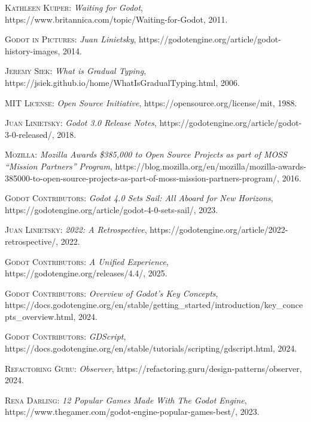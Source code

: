 \documentclass[
]{thesis-ekf}
\theoremstyle{definition}
\theoremstyle{remark}
\begin{document}
	\begin{thebibliography}{2}
		
		\textsc{Kathleen Kuiper}: \emph{Waiting for Godot}, https://www.britannica.com/topic/Waiting-for-Godot, 2011.
		
		\textsc{Godot in Pictures}: \emph{Juan Linietsky}, https://godotengine.org/article/godot-history-images, 2014.
		
		\textsc{Jeremy Siek}: \emph{What is Gradual Typing}, https://jsiek.github.io/home/WhatIsGradualTyping.html, 2006.
		
		\textsc{MIT License}: \emph{Open Source Initiative}, https://opensource.org/license/mit, 1988.
		
		\textsc{Juan Linietsky}: \emph{Godot 3.0 Release Notes}, https://godotengine.org/article/godot-3-0-released/, 2018.
		
		\textsc{Mozilla}: \emph{Mozilla Awards \$385,000 to Open Source Projects as part of MOSS “Mission Partners” Program}, https://blog.mozilla.org/en/mozilla/mozilla-awards-385000-to-open-source-projects-as-part-of-moss-mission-partners-program/, 2016.
		
		\textsc{Godot Contributors}: \emph{Godot 4.0 Sets Sail: All Aboard for New Horizons}, https://godotengine.org/article/godot-4-0-sets-sail/, 2023.
		
		\textsc{Juan Linietsky}: \emph{2022: A Retrospective}, https://godotengine.org/article/2022-retrospective/, 2022.
		
		\textsc{Godot Contributors}: \emph{A Unified Experience}, https://godotengine.org/releases/4.4/, 2025.
		
		\textsc{Godot Contributors}: \emph{Overview of Godot's Key Concepts}, https://docs.godotengine.org/en/stable/getting\_started/introduction/key\_concepts\_overview.html, 2024.
		
		\textsc{Godot Contributors}: \emph{GDScript}, https://docs.godotengine.org/en/stable/tutorials/scripting/gdscript.html, 2024.
		
		\textsc{Refactoring Guru}: \emph{Observer}, https://refactoring.guru/design-patterns/observer, 2024.
		
		\textsc{Rena Darling}: \emph{12 Popular Games Made With The Godot Engine}, https://www.thegamer.com/godot-engine-popular-games-best/, 2023.
		

\end{thebibliography}
\end{document}
